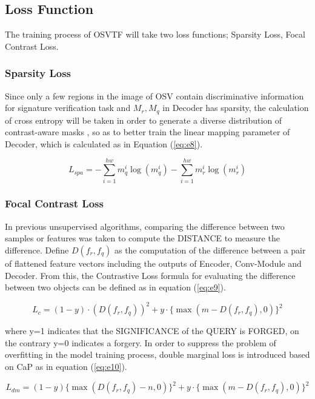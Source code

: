 \documentclass{article}
\begin{document}
\subsection{Loss Function}

The training process of OSVTF will take two loss functions; Sparsity Loss, Focal Contrast Loss.

\subsubsection*{Sparsity Loss}
Since only a few regions in the image of OSV contain discriminative information for signature verification task and $M_r,M_q$ in Decoder has sparsity, the calculation of cross entropy will be taken in order to generate a diverse distribution of contrast-aware masks \cite{20}, so as to better train the linear mapping parameter of Decoder, which is calculated as in Equation (\ref{eq:e8}).

\begin{equation}\label{eq:e8}
	L_{spa}=-\sum_{i=1}^{hw} m_q^i \log(m_q^i ) - \sum_{i=1}^{hw} m_r^i \log(m_r^i)
\end{equation}


\subsubsection*{Focal Contrast Loss}

In previous unsupervised algorithms, comparing the difference between two samples or features was taken to compute the DISTANCE to measure the difference. Define $D(f_r, f_q)$ as the computation of the difference between a pair of flattened feature vectors including the outputs of Encoder, Conv-Module and Decoder. From this, the Contrastive Loss \cite{23} formula for evaluating the difference between two objects can be defined as in equation (\ref{eq:e9}).

\begin{equation}\label{eq:e9}
	L_c = (1 - y) \cdot (D(f_r, f_q))^2 + y \cdot \{\max(m-D(f_r, f_q), 0)\}^2
\end{equation}

where y=1 indicates that the SIGNIFICANCE of the QUERY is FORGED, on the contrary y=0 indicates a forgery. In order to suppress the problem of overfitting in the model training process, double marginal loss is introduced based on CaP \cite{24} as in equation (\ref{eq:e10}).

\begin{equation}\label{eq:e10}
	L_{dm}=(1 - y)\{\max(D(f_r, f_q) - n, 0) \}^2 + y \cdot \{\max(m - D(f_r, f_q), 0)\}^2
\end{equation}
\end{document}
